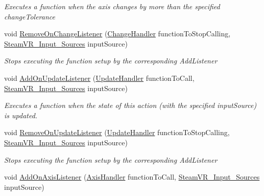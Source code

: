 \begin{DoxyCompactItemize}
\begin{DoxyCompactList}\small\item\em Executes a function when the axis changes by more than the specified change\+Tolerance \end{DoxyCompactList}\item 
void \mbox{\hyperlink{class_valve_1_1_v_r_1_1_steam_v_r___action___single_a4f3b457d103cf2fa28d805a274977b85}{Remove\+On\+Change\+Listener}} (\mbox{\hyperlink{class_valve_1_1_v_r_1_1_steam_v_r___action___single_ae0c72c83dccd88a0235e8a831d62116e}{Change\+Handler}} function\+To\+Stop\+Calling, \mbox{\hyperlink{namespace_valve_1_1_v_r_a82e5bf501cc3aa155444ee3f0662853f}{Steam\+V\+R\+\_\+\+Input\+\_\+\+Sources}} input\+Source)
\begin{DoxyCompactList}\small\item\em Stops executing the function setup by the corresponding Add\+Listener \end{DoxyCompactList}\item 
void \mbox{\hyperlink{class_valve_1_1_v_r_1_1_steam_v_r___action___single_a5a1d4b3c8ba06700a28cdcffbf3674ae}{Add\+On\+Update\+Listener}} (\mbox{\hyperlink{class_valve_1_1_v_r_1_1_steam_v_r___action___single_a1514666eabcafba498274e8d6cee2a40}{Update\+Handler}} function\+To\+Call, \mbox{\hyperlink{namespace_valve_1_1_v_r_a82e5bf501cc3aa155444ee3f0662853f}{Steam\+V\+R\+\_\+\+Input\+\_\+\+Sources}} input\+Source)
\begin{DoxyCompactList}\small\item\em Executes a function when the state of this action (with the specified input\+Source) is updated. \end{DoxyCompactList}\item 
void \mbox{\hyperlink{class_valve_1_1_v_r_1_1_steam_v_r___action___single_afde34c68d7e2d5af7fadca23e7440ccb}{Remove\+On\+Update\+Listener}} (\mbox{\hyperlink{class_valve_1_1_v_r_1_1_steam_v_r___action___single_a1514666eabcafba498274e8d6cee2a40}{Update\+Handler}} function\+To\+Stop\+Calling, \mbox{\hyperlink{namespace_valve_1_1_v_r_a82e5bf501cc3aa155444ee3f0662853f}{Steam\+V\+R\+\_\+\+Input\+\_\+\+Sources}} input\+Source)
\begin{DoxyCompactList}\small\item\em Stops executing the function setup by the corresponding Add\+Listener \end{DoxyCompactList}\item 
void \mbox{\hyperlink{class_valve_1_1_v_r_1_1_steam_v_r___action___single_a7de52c2fa108e420f018e31065c915be}{Add\+On\+Axis\+Listener}} (\mbox{\hyperlink{class_valve_1_1_v_r_1_1_steam_v_r___action___single_a4193937cd6b6e4b7248374bc5636f6fd}{Axis\+Handler}} function\+To\+Call, \mbox{\hyperlink{namespace_valve_1_1_v_r_a82e5bf501cc3aa155444ee3f0662853f}{Steam\+V\+R\+\_\+\+Input\+\_\+\+Sources}} input\+Source)

\end{DoxyCompactItemize}

